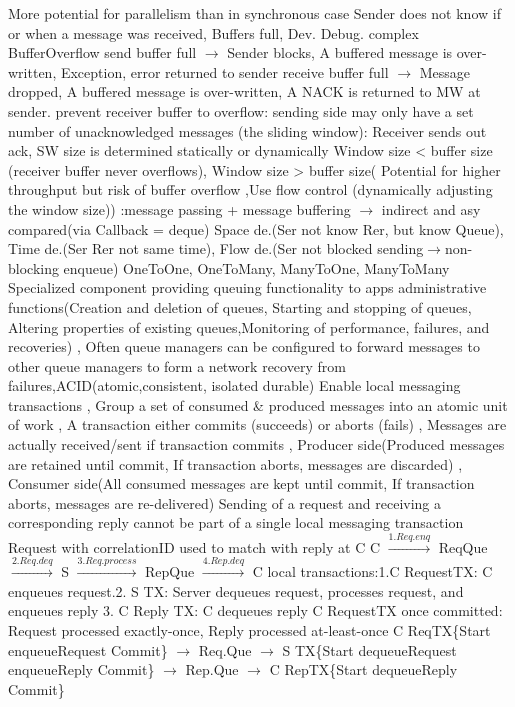More potential for parallelism than in synchronous case
\btext{-:}
Sender does not know if or when a message was received,
Buffers full,
Dev. Debug. complex
\textbar {}
BufferOverflow
send buffer full $\rightarrow$
Sender blocks,
A buffered message is over-written,
Exception, error returned to sender
\textbar
receive buffer full $\rightarrow$
Message dropped,
A buffered message is over-written,
A NACK is returned to MW at sender.
\textbar {}
prevent receiver buffer to overflow:
sending side may only have a set number of unacknowledged messages (the sliding window):
Receiver sends out ack,
SW size is determined statically or dynamically
Window size < buffer size (receiver buffer never overflows),
Window size > buffer size( Potential for higher throughput but risk of buffer overflow
,Use flow control (dynamically adjusting the window size))
\textbar {}:message passing + message buffering
\textbar {} $\rightarrow$ indirect and asy compared(via Callback = deque)
Space de.(Ser not know Rer, but know Queue),
Time de.(Ser Rer not same time),
Flow de.(Ser not blocked sending$\rightarrow$non-blocking enqueue)
\textbar {}
OneToOne, OneToMany, ManyToOne, ManyToMany
\textbar {}
Specialized component providing queuing functionality to apps
administrative functions(Creation and deletion of queues, Starting and stopping of queues,
Altering properties of existing queues,Monitoring of performance, failures, and recoveries)
, Often queue managers can be configured to forward messages to other queue managers to form a network
\textbar {}recovery from failures,ACID(atomic,consistent, isolated durable)
Enable local messaging transactions
, Group a set of consumed \& produced messages into an atomic unit of work
, A transaction either commits (succeeds) or aborts (fails)
, Messages are actually received/sent if transaction commits
, Producer side(Produced messages are retained until commit, If transaction aborts, messages are discarded)
, Consumer side(All consumed messages are kept until commit, If transaction aborts, messages are re-delivered)
Sending of a request and receiving a corresponding reply cannot be part of a single local messaging transaction
\textbar {}Request with correlationID used to match with reply at C
C $\overset{1.Req.enq}{\rightarrow}$ ReqQue $\overset{2.Req.deq}{\rightarrow}$ S
$\overset{3.Req.process}{\rightarrow}$ RepQue $\overset{4.Rep.deq}{\rightarrow}$ C
\textbar {} local transactions:1.C RequestTX: C enqueues request.2. S TX: Server dequeues request, processes request, and enqueues reply
3. C Reply TX: C dequeues reply
\textbar C RequestTX once committed: Request processed exactly-once, Reply processed at-least-once
\textbar C ReqTX\{Start enqueueRequest Commit\} $\rightarrow$ Req.Que 
$\rightarrow$ S TX\{Start dequeueRequest enqueueReply Commit\} $\rightarrow$ Rep.Que 
$\rightarrow$ C RepTX\{Start dequeueReply Commit\}

